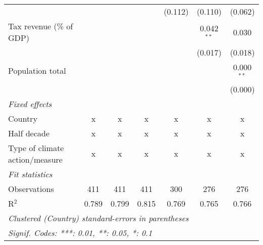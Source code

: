 \begin{tabular}{lcccccc}
                                                    &         &                &                & (0.112)        & (0.110)        & (0.062)\\   
   Tax revenue (\% of GDP)                          &         &                &                &                & 0.042$^{**}$   & 0.030\\   
                                                    &         &                &                &                & (0.017)        & (0.018)\\   
   Population total                                 &         &                &                &                &                & 0.000$^{**}$\\   
                                                    &         &                &                &                &                & (0.000)\\   
   \emph{Fixed effects}\\
   Country                                          & x       & x              & x              & x              & x              & x\\  
   Half decade                                      & x       & x              & x              & x              & x              & x\\  
   Type of climate action/measure                   & x       & x              & x              & x              & x              & x\\  
   \midrule \emph{Fit statistics}\\
   Observations                                     & 411     & 411            & 411            & 300            & 276            & 276\\  
   R$^2$                                            & 0.789   & 0.799          & 0.815          & 0.769          & 0.765          & 0.766\\  
   \midrule
   \multicolumn{7}{l}{\emph{Clustered (Country) standard-errors in parentheses}}\\
   \multicolumn{7}{l}{\emph{Signif. Codes: ***: 0.01, **: 0.05, *: 0.1}}\\
\end{tabular}
\par\endgroup


